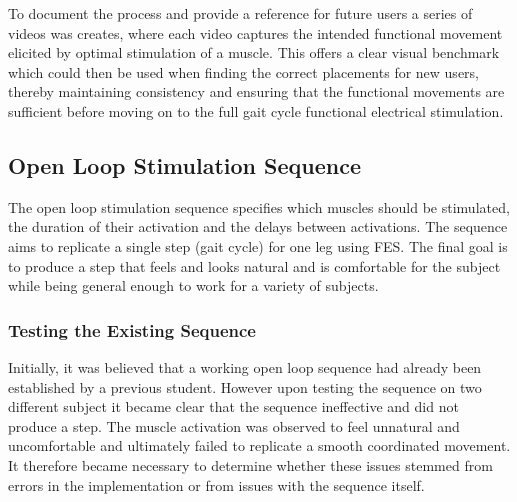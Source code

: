 To document the process and provide a reference for future users a series of videos was creates, where each video captures the intended functional movement elicited by optimal stimulation of a muscle. This offers a clear visual benchmark which could then be used when finding the correct placements for new users, thereby maintaining consistency and ensuring that the functional movements are sufficient before moving on to the full gait cycle functional electrical stimulation.

\subsection{Open Loop Stimulation Sequence}
The open loop stimulation sequence specifies which muscles should be stimulated, the duration of their activation and the delays between activations. The sequence aims to replicate a single step (gait cycle) for one leg using FES. The final goal is to produce a step that feels and looks natural and is comfortable for the subject while being general enough to work for a variety of subjects.

\subsubsection{Testing the Existing Sequence}
Initially, it was believed that a working open loop sequence had already been established by a previous student. However upon testing the sequence on two different subject it became clear that the sequence ineffective and did not produce a step. The muscle activation was observed to feel unnatural and uncomfortable and ultimately failed to replicate a smooth coordinated movement. It therefore became necessary to determine whether these issues stemmed from errors in the implementation or from issues with the sequence itself.

